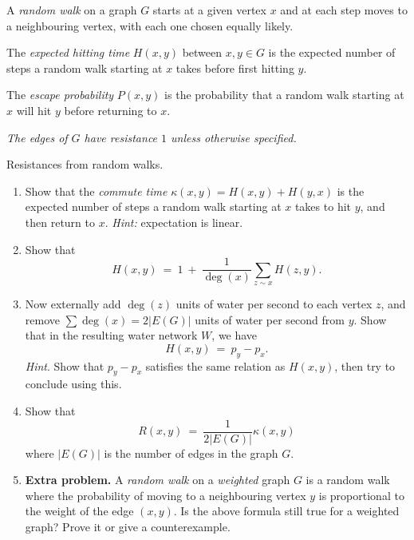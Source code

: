 \documentclass[11pt,fleqn]{book} %
\begin{document}
\begin{definition}
    A \emph{random walk} on a graph $G$ starts at a given vertex $x$ and at each step moves to a neighbouring vertex, with each one chosen equally likely.
\end{definition}


\begin{definition}
    The \textit{expected hitting time} $H(x,y)$ between $x,y\in G$ is the expected number of steps a random walk starting at $x$ takes before first hitting $y$.
\end{definition}



\begin{definition}
   The \emph{escape probability} $P(x,y)$ is the probability that a random walk starting at $x$ will hit $y$ before returning to $x$.
\end{definition}


\textit{The edges of $G$ have resistance $1$ unless otherwise specified.}


\begin{problem}
  Resistances from random walks.
  \begin{enumerate}[label =\alph*.]
   \item  Show that the \textit{commute time} $\kappa(x,y)=H(x,y)+H(y,x)$ is the expected number of steps a random walk starting at $x$ takes to hit $y$, and then return to $x$. \textit{Hint:} expectation is linear. 
   \item  Show that 
       $$H(x,y) \ = \ 1 \ + \ \frac{1}{\deg(x)}\sum_{z\sim x} H(z,y).$$
       \item  Now externally add $\deg(z)$ units of water per second to each vertex $z$, and remove $\sum \deg(x) = 2|E(G)|$ units of water per second from $y$. Show that in the resulting water network $W$, we have 
       $$H(x,y) \ = \  p_y-p_x.$$
    \textit{Hint}. Show that $p_y-p_x$ satisfies the same relation as $H(x,y)$, then try to conclude using this.
   \item Show that 
    $$R(x,y) \ = \ \frac{1}{2|E(G)|} \kappa(x,y) $$
    where $|E(G)|$ is the number of edges in the graph $G$.
    
    
    \item \textbf{Extra problem.}  A \textit{random walk} on a \textit{weighted} graph $G$ is a random walk where the probability of moving to a neighbouring vertex $y$ is proportional to the weight of the edge $(x,y)$. Is the above formula still true for a weighted graph? Prove it or give a counterexample.
  \end{enumerate}
\end{problem}
\end{document}

